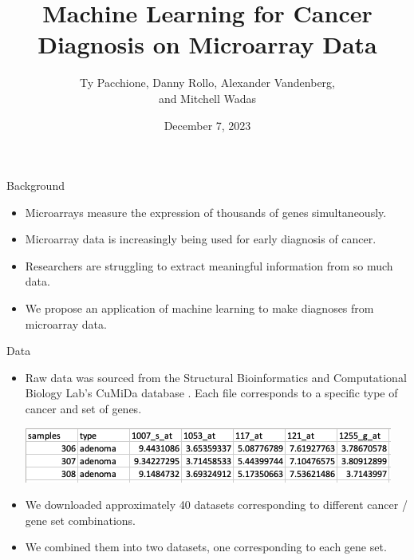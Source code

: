 \documentclass{beamer}
\title[ML for Cancer Diagnosis] {
    Machine Learning for Cancer Diagnosis on Microarray Data
}
\author[Pacchione, Rollo, Vandenberg, Wadas] {
    Ty Pacchione, Danny Rollo, Alexander Vandenberg, \\ and Mitchell Wadas
}
\date {
    December 7, 2023
}
\begin{document}
    \frame{\titlepage}

    \begin{frame}{Background}
        \begin{itemize}\setlength\itemsep{15pt}
            \item {
                Microarrays measure the expression of thousands of genes simultaneously. 
            }
            \item {
                Microarray data is increasingly being used for early diagnosis of cancer.
            }
            \item {
                Researchers are struggling to extract meaningful information from so much data.
            }
            \item {
                We propose an application of machine learning to make diagnoses from microarray data.
            }
        \end{itemize}
    \end{frame}
    
    \begin{frame}{Data}
        \begin{itemize} \setlength\itemsep{15pt}
            \item {
                Raw data was sourced from the Structural Bioinformatics and Computational Biology Lab's
                CuMiDa database \cite{CuMiDa}. 
                Each file corresponds to a specific type of cancer and set of genes. 

                \begin{center}
                    \vspace{10pt}
                    \includegraphics[scale=.6]{SampleScreenshot.png}
                \end{center}
            }
            \item {
                We downloaded approximately 40 datasets corresponding to different cancer / gene set
                combinations.
            }
            \item {
                We combined them into two datasets, one corresponding to each gene set.
            }
        \end{itemize}
    \end{frame}
\end{document}
